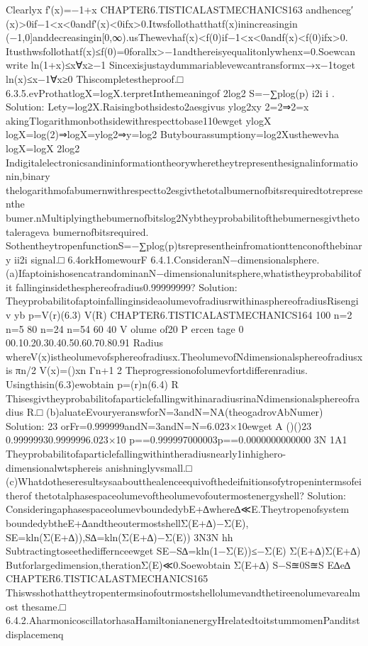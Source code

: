 {{{{{{{{{{Clearlyx
f′(x)=−1+x
CHAPTER6.TISTICALASTMECHANICS163
andhenceg′(x)>0if−1<x<0andf′(x)<0ifx>0.Itwsfollothatthatf(x)inincreasingin
(−1,0]anddecreasingin[0,∞).usThewevhaf(x)<f(0)if−1<x<0andf(x)<f(0)ifx>0.
Itusthwsfollothatf(x)≤f(0)=0forallx>−1andthereisyequalitonlywhenx=0.Soewcan
write
ln(1+x)≤x∀x≥−1
Sincexisjustaydummariablevewcantransformx→x−1toget
ln(x)≤x−1∀x≥0
Thiscompletestheproof.□
6.3.5.evProthatlogX=logX.terpretInthemeaningof
2log2
S=−∑plog(p)
i2i
i
.
Solution:
Lety=log2X.Raisingbothsidesto2aesgivus
ylog2xy
2=2⇒2=x
akingTlogarithmonbothsidewithrespecttobase110ewget
ylogX
logX=log(2)⇒logX=ylog2⇒y=log2
Butybourassumptiony=log2Xusthewevha
logX=logX
2log2
Indigitalelectronicsandininformationtheorywheretheytrepresenthesignalinformationin,binary
thelogarithmofabumernwithrespectto2esgivthetotalbumernofbitsrequiredtotrepresenthe
bumer.nMultiplyingthebumernofbitslog2Nybtheyprobabilitofthebumernesgivthetotalerageva
bumernofbitsrequired.
SothentheytropenfunctionS=−∑plog(p)tsrepresentheinfromationttenconofthebinary
ii2i
signal.□
6.4orkHomewourF
6.4.1.ConsideranN−dimensionalsphere.
(a)IfaptoinishosencatrandominanN−dimensionalunitsphere,whatistheyprobabilitofit
fallinginsidethesphereofradius0.99999999?
Solution:
TheyprobabilitofaptoinfallinginsideaolumevofradiusrwithinasphereofradiusRisengiv
yb
p=V(r)(6.3)
V(R)
CHAPTER6.TISTICALASTMECHANICS164
100
n=2
n=5
80
n=24
n=54
60
40
V
olume
of20
P
ercen
tage
0
00.10.20.30.40.50.60.70.80.91
Radius
whereV(x)istheolumevofsphereofradiusx.TheolumevofNdimensionalsphereofradiusx
is
πn/2
V(x)=()xn
Γn+1
2
Theprogressionofolumevfortdifferenradius.
Usingthisin(6.3)ewobtain
p=(r)n(6.4)
R
ThisesgivtheyprobabilitofaparticlefallingwithinaradiusrinaNdimensionalsphereofradius
R.□
(b)aluateEvouryeranswforN=3andN=NA(theogadrovAbNumer)
Solution:
23
orFr=0.999999andN=3andN=N=6.023×10ewget
A
()()23
0.99999930.9999996.023×10
p==0.999997000003p==0.0000000000000
3N
1A1
Theyprobabilitofaparticlefallingwithintheradiusnearly1inhighero-dimensionalwtsphereis
anishninglyvsmall.□
(c)Whatdotheseresultsysaaboutthealenceequivofthedeifnitionsofytropenintermsofeitherof
thetotalphasespaceolumevoftheolumevofoutermostenergyshell?
Solution:
ConsideringaphasespaceolumevboundedybE+∆where∆≪E.Theytropenofsystem
boundedybtheE+∆andtheoutermostshellΣ(E+∆)−Σ(E),
SE=kln(Σ(E+∆)),S∆=kln(Σ(E+∆)−Σ(E))
3N3N
hh
Subtractingtoseethediffernceewget
SE−S∆=kln(1−Σ(E))≤−Σ(E)
Σ(E+∆)Σ(E+∆)
Butforlargedimension,therationΣ(E)≪0.Soewobtain
Σ(E+∆)
S−S≊0S≊S
E∆e∆
CHAPTER6.TISTICALASTMECHANICS165
Thiswsshothattheytropentermsinofoutrmostshellolumevandthetireenolumevarealmost
thesame.□
6.4.2.AharmonicoscillatorhasaHamiltonianenergyHrelatedtoitstummomenPanditstdisplacemenq
}}}}}}}}}}
